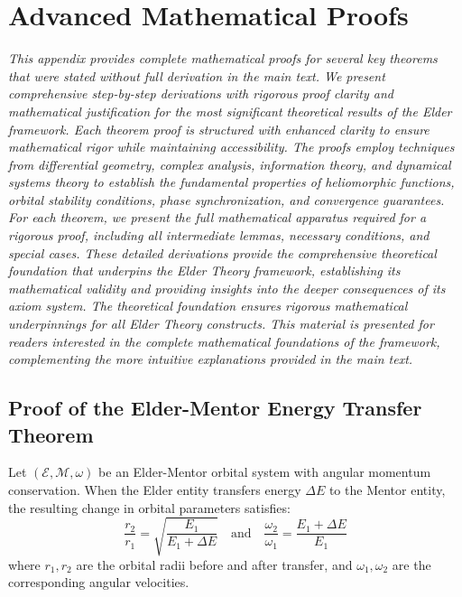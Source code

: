 \chapter{Advanced Mathematical Proofs}

\textit{This appendix provides complete mathematical proofs for several key theorems that were stated without full derivation in the main text. We present comprehensive step-by-step derivations with rigorous proof clarity and mathematical justification for the most significant theoretical results of the Elder framework. Each theorem proof is structured with enhanced clarity to ensure mathematical rigor while maintaining accessibility. The proofs employ techniques from differential geometry, complex analysis, information theory, and dynamical systems theory to establish the fundamental properties of heliomorphic functions, orbital stability conditions, phase synchronization, and convergence guarantees. For each theorem, we present the full mathematical apparatus required for a rigorous proof, including all intermediate lemmas, necessary conditions, and special cases. These detailed derivations provide the comprehensive theoretical foundation that underpins the Elder Theory framework, establishing its mathematical validity and providing insights into the deeper consequences of its axiom system. The theoretical foundation ensures rigorous mathematical underpinnings for all Elder Theory constructs. This material is presented for readers interested in the complete mathematical foundations of the framework, complementing the more intuitive explanations provided in the main text.}

\section{Proof of the Elder-Mentor Energy Transfer Theorem}

\begin{theorem}
Let $(\mathcal{E}, \mathcal{M}, \omega)$ be an Elder-Mentor orbital system with angular momentum conservation. When the Elder entity transfers energy $\Delta E$ to the Mentor entity, the resulting change in orbital parameters satisfies:
\begin{equation}
\frac{r_2}{r_1} = \sqrt{\frac{E_1}{E_1 + \Delta E}} \quad \text{and} \quad \frac{\omega_2}{\omega_1} = \frac{E_1 + \Delta E}{E_1}
\end{equation}
where $r_1, r_2$ are the orbital radii before and after transfer, and $\omega_1, \omega_2$ are the corresponding angular velocities.
\end{theorem}

